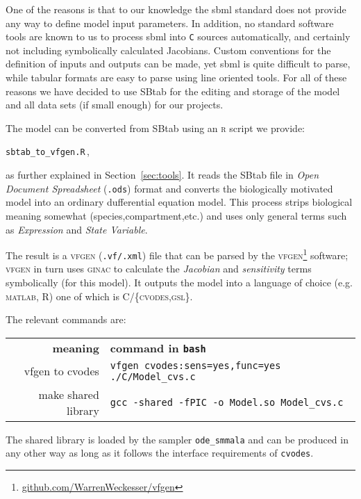\documentclass[utf8,english,DIV=12,12pt]{scrartcl}
\newcommand{\software}[1]{\textsc{#1}}
\newcommand{\standard}[1]{\textsf{#1}}
\begin{document}
One of the reasons is that to our knowledge the \standard{sbml}
standard does not provide any way to define model input parameters. In
addition, no standard software tools are known to us to process
\standard{sbml} into \texttt{C} sources automatically, and certainly
not including symbolically calculated Jacobians. Custom conventions
for the definition of inputs and outputs can be made, yet
\standard{sbml} is quite difficult to parse, while tabular formats are
easy to parse using line oriented tools. For all of these reasons we
have decided to use \standard{SBtab} for the editing and storage of
the model and all data sets (if small enough) for our projects.

The model can be converted from \standard{SBtab} using an \software{r}
script we provide:
\begin{center}
\texttt{sbtab\_to\_vfgen.R}\,,
\end{center}
as further explained in Section~\ref{sec:tools}.
It reads the \standard{SBtab} file in \emph{Open Document Spreadsheet}
(\texttt{.ods}) format and converts the biologically motivated model
into an ordinary dufferential equation model. This process strips
biological meaning somewhat (species,compartment,etc.) and uses only
general terms such as \emph{Expression} and \emph{State Variable}.

The result is a \software{vfgen} (\texttt{.vf/.xml}) file that can be
parsed by the
\software{vfgen}\footnote{\url{github.com/WarrenWeckesser/vfgen}}
software; \software{vfgen} in turn uses \software{ginac} to calculate
the \emph{Jacobian} and \emph{sensitivity} terms symbolically (for
this model). It outputs the model into a language of choice
(e.g. \textsc{matlab}, \textsc{R}) one of which is
\textsc{C/\{cvodes,gsl\}}.

The relevant commands are:
\begin{center}
\begin{tabular}{rl}
  \textbf{meaning}&\textbf{command in \texttt{bash}}\\
  vfgen to cvodes&\texttt{vfgen cvodes:sens=yes,func=yes ./C/Model\_cvs.c}\\
  make shared library&\texttt{gcc -shared -fPIC -o Model.so Model\_cvs.c}
\end{tabular}
\end{center}

The shared library is loaded by the sampler \texttt{ode\_smmala} and
can be produced in any other way as long as it follows the interface
requirements of \texttt{cvodes}.
\end{document}
